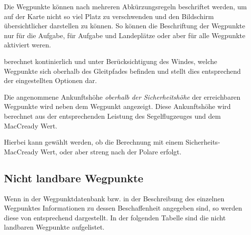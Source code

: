 Die Wegpunkte können nach mehreren Abkürzungsregeln beschriftet werden, um auf 
 der Karte nicht so viel Platz zu verschwenden und den Bildschirm übersichtlicher darstellen zu können. 
So können die Beschriftung der Wegpunkte nur für die Aufgabe, für Aufgabe und Landeplätze oder aber für alle Wegpunkte aktiviert weren.


\xc berechnet kontinierlich und unter Berücksichtigung des Windes, welche Wegpunkte sich oberhalb des Gleitpfades befinden und stellt dies entsprechend der eingestellten Optionen dar.

Die angenommene Ankunftshöhe {\em oberhalb der Sicherheitshöhe} der erreichbaren Wegpunkte wird neben dem Wegpunkt angezeigt. Diese Ankunftshöhe wird berechnet aus der entsprechenden Leistung des Segelflugzeuges und dem MacCready Wert. 

 Hierbei kann gewählt werden, ob die Berechnung mit einem Sicherheits-MacCready Wert, oder aber streng nach der Polare erfolgt.

\subsection*{Nicht landbare Wegpunkte}
Wenn in der  Wegpunktdatenbank bzw. in der Beschreibung des einzelnen Wegpunktes Informationen zu dessen Beschaffenheit angegeben sind, so werden diese von \xc   entsprechend dargestellt. In der folgenden Tabelle sind die nicht landbaren Wegpunkte aufgelistet. 

